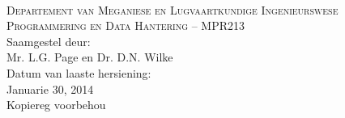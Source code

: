 \begin{titlepage}
    \thispagestyle{empty}
    \begin{center}
        \ \\
        \vspace{2cm}
        {\Large \textsc{Departement van Meganiese en Lugvaartkundige
                        Ingenieurswese}} \\
        \vspace{1.5cm}
        {\huge \textsc{Programmering en Data Hantering -- MPR213}} \\
        \vspace{3cm}
        {\large Saamgestel deur:} \\
        \vspace{0.2cm}
        {\large Mr. L.G. Page en Dr. D.N. Wilke} \\
        \vspace{1cm}
        {\large Datum van laaste hersiening:} \\
        \vspace{0.2cm}
        {\large Januarie 30, 2014} \\
        \vspace{1cm}
        {\large Kopiereg voorbehou} \\
    \end{center}
\end{titlepage}
